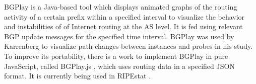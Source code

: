 BGPlay \cite{bgplay} is a Java-based tool which displays animated graphs of the routing activity of a certain prefix within a specified interval to visualize the behavior and instabilities of of Internet routing at the AS level. It is fed using relevant BGP update messages for the specified time interval. BGPlay was used by Karrenberg \cite{karrenberg2005anycast} to visualize path changes between instances and probes in his study. To improve its portability, there is a work to implement BGPlay in pure JavaScript, called BGPlay.js \cite{bgplay.js}, which uses routing data in a specified JSON format. It is currently being used in RIPEstat \cite{ripestat}. 



